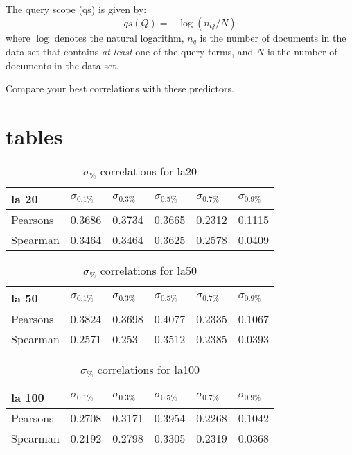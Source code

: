 \documentclass{sig-alternate}
\begin{document}
The query scope \cite{he2004inferring} (qs) is given by:
\begin{equation}
qs(Q) = -\log(n_Q/N)
\end{equation}
where $\log$ denotes the natural logarithm, $n_q$ is the number of documents in the data set that contains \emph{at least} one of the query terms, and $N$ is the number of documents in the data set.

Compare your best correlations with these predictors.

\section{tables}

\begin{table}[h!]
\centering
\caption{$\sigma_{\%}$ correlations for la20}
\begin{tabular}{|l|l|l|l|l|l|}
\hline
la 20 & $\sigma_{0.1\%}$ & $\sigma_{0.3\%}$ & $\sigma_{0.5\%}$ & $\sigma_{0.7\%}$ & $\sigma_{0.9\%}$ \\ \hline
Pearsons  & 0.3686 & 0.3734 & 0.3665 & 0.2312 & 0.1115 \\ \hline
Spearman  & 0.3464 & 0.3464 & 0.3625 & 0.2578 & 0.0409 \\ \hline
\end{tabular}
\end{table}
\begin{table}[h!]
\centering
\caption{$\sigma_{\%}$ correlations for la50}
\begin{tabular}{|l|l|l|l|l|l|}
\hline
la 50 & $\sigma_{0.1\%}$ & $\sigma_{0.3\%}$ & $\sigma_{0.5\%}$ & $\sigma_{0.7\%}$ & $\sigma_{0.9\%}$ \\ \hline
Pearsons  & 0.3824 & 0.3698 & 0.4077 & 0.2335 & 0.1067 \\ \hline
Spearman  & 0.2571 & 0.253 & 0.3512 & 0.2385 & 0.0393 \\ \hline
\end{tabular}
\end{table}
\begin{table}[h!]
\centering
\caption{$\sigma_{\%}$ correlations for la100}
\begin{tabular}{|l|l|l|l|l|l|}
\hline
la 100 & $\sigma_{0.1\%}$ & $\sigma_{0.3\%}$ & $\sigma_{0.5\%}$ & $\sigma_{0.7\%}$ & $\sigma_{0.9\%}$ \\ \hline
Pearsons  & 0.2708 & 0.3171 & 0.3954 & 0.2268 & 0.1042 \\ \hline
Spearman  & 0.2192 & 0.2798 & 0.3305 & 0.2319 & 0.0368 \\ \hline
\end{tabular}
\end{table}
\end{document}
